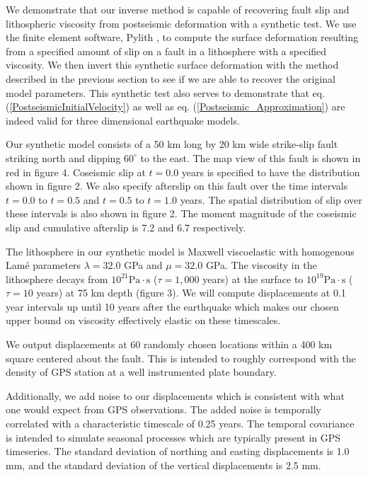 \documentclass[12pt]{article}
\begin{document}
We demonstrate that our inverse method is capable of recovering
fault slip and lithospheric viscosity from postseismic deformation
with a synthetic test.  We use the finite element software,
Pylith \citep{A2007}, to compute the surface deformation resulting from
a specified amount of slip on a fault in a lithosphere with a
specified viscosity.  We then invert this synthetic surface
deformation with the method described in the previous section to see
if we are able to recover the original model parameters.  This
synthetic test also serves to demonstrate that
eq. (\ref{PostseismicInitialVelocity}) as well as
eq. (\ref{Postseismic_Approximation}) are indeed valid for three
dimensional earthquake models.

Our synthetic model consists of a 50 km long by 20 km wide strike-slip
fault striking north and dipping $60^{\circ}$ to the east.  The map
view of this fault is shown in red in figure 4. Coseismic slip at
$t=0.0$ years is specified to have the distribution shown in figure 2.
We also specify afterslip on this fault over the time intervals
$t=0.0$ to $t=0.5$ and $t=0.5$ to $t=1.0$ years.  The spatial
distribution of slip over these intervals is also shown in figure 2.  The
moment magnitude of the coseismic slip and cumulative afterslip is 7.2
and 6.7 respectively.

The lithosphere in our synthetic model is Maxwell viscoelastic with
homogenous Lam\'e parameters $\lambda = 32.0$ GPa and $\mu = 32.0$
GPa.  The viscosity in the lithosphere decays from
$10^{21}\mathrm{Pa}\cdot\mathrm{s}$ ($\tau = 1,000$ years) at the
surface to $10^{19}\mathrm{Pa}\cdot\mathrm{s}$ ($\tau = 10$ years) at
75 km depth (figure 3).  We will compute displacements at 0.1 year
intervals up until 10 years after the earthquake which makes our
chosen upper bound on viscosity effectively elastic on these
timescales.

We output displacements at 60 randomly chosen locations within a 400
km square centered about the fault.  This is intended to roughly correspond with the
density of GPS station at a well instrumented plate boundary.

Additionally, we add noise to our displacements which is consistent
with what one would expect from GPS observations.  The added noise is
temporally correlated with a characteristic timescale of 0.25 years.
The temporal covariance is intended to simulate seasonal processes
which are typically present in GPS timeseries.  The standard deviation
of northing and easting displacements is 1.0 mm, and the standard
deviation of the vertical displacements is 2.5 mm.
\end{document}
